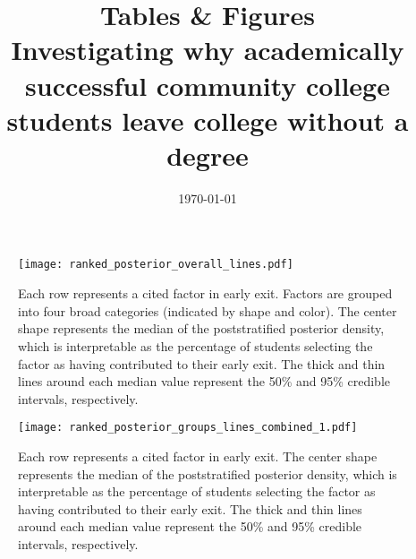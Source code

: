 \documentclass[12pt]{article}
\title{Tables \& Figures \\
  {\normalsize Investigating why academically successful community
    college students leave college without a degree}}
\date{\mydate\today}
\newcommand{\rootpath}{..}
\newcommand{\tabdir}{\rootpath/tables}
\begin{document}




\clearpage



\begin{figure*}[!ht]
  \texttt{[image: ranked\_posterior\_overall\_lines.pdf]}
  \caption[Factors contributing to early exit from college]{Each row
    represents a cited factor in early exit. Factors are grouped into
    four broad categories (indicated by shape and color). The center
    shape represents the median of the poststratified posterior
    density, which is interpretable as the percentage of students
    selecting the factor as having contributed to their early
    exit. The thick and thin lines around each median value represent
    the 50\% and 95\% credible intervals, respectively.}
  \label{fig:postrank}
\end{figure*}

  
\begin{figure*}[!ht]
  \texttt{[image: ranked\_posterior\_groups\_lines\_combined\_1.pdf]}
  \caption[Factors contributing to early exit from college, by
  groups]{Each row represents a cited factor in early exit. The center
    shape represents the median of the poststratified posterior
    density, which is interpretable as the percentage of students
    selecting the factor as having contributed to their early
    exit. The thick and thin lines around each median value represent
    the 50\% and 95\% credible intervals, respectively.}
    \label{fig:subgroups1}
  \end{figure*}
\end{document}
